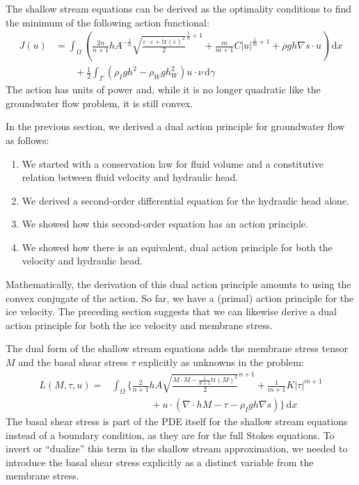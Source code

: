 \documentclass{article}
\theoremstyle{definition}
\theoremstyle{plain}
\newcommand{\ud}{\hspace{2pt}\mathrm{d}}
\begin{document}
The shallow stream equations can be derived as the optimality conditions to find the minimum of the following action functional:
\begin{align}
    J(u) & = \int_\Omega\left(\frac{2n}{n + 1}hA^{-\frac{1}{n}}\sqrt{\frac{\dot\varepsilon\cdot\dot\varepsilon + \text{tr}(\dot\varepsilon)^2}{2}}^{\frac{1}{n} + 1} + \frac{m}{m + 1}C|u|^{\frac{1}{m} + 1} + \rho gh\nabla s\cdot u\right)\ud x  \nonumber \\
    & \qquad + \frac{1}{2}\int_\Gamma\left(\rho_Igh^2 - \rho_Wgh_W^2\right)u\cdot\nu\ud\gamma
    \label{eq:ssa-primal-action}
\end{align}
The action has units of power and, while it is no longer quadratic like the groundwater flow problem, it is still convex.

In the previous section, we derived a dual action principle for groundwater flow as follows:
\begin{enumerate}
    \item We started with a conservation law for fluid volume and a constitutive relation between fluid velocity and hydraulic head.
    \item We derived a second-order differential equation for the hydraulic head alone.
    \item We showed how this second-order equation has an action principle.
    \item We showed how there is an equivalent, dual action principle for both the velocity and hydraulic head.
\end{enumerate}
Mathematically, the derivation of this dual action principle amounts to using the convex conjugate of the action.
So far, we have a (primal) action principle for the ice velocity.
The preceding section suggests that we can likewise derive a dual action principle for both the ice velocity and membrane stress.

The dual form of the shallow stream equations adds the membrane stress tensor $M$ and the basal shear stress $\tau$ explicitly as unknowns in the problem:
\begin{align}
    L(M, \tau, u) = & \int_\Omega\Bigg\{\frac{2}{n + 1}hA\sqrt{\frac{M\cdot M - \frac{1}{d + 1}\text{tr}(M)^2}{2}}^{n + 1} + \frac{1}{m + 1}K|\tau|^{m + 1} \nonumber\\
    & \qquad\qquad + u\cdot\left(\nabla\cdot hM - \tau - \rho_Igh\nabla s\right)\Bigg\}\ud x
\end{align}
The basal shear stress is part of the PDE itself for the shallow stream equations instead of a boundary condition, as they are for the full Stokes equations.
To invert or ``dualize'' this term in the shallow stream approximation, we needed to introduce the basal shear stress explicitly as a distinct variable from the membrane stress.
\end{document}
